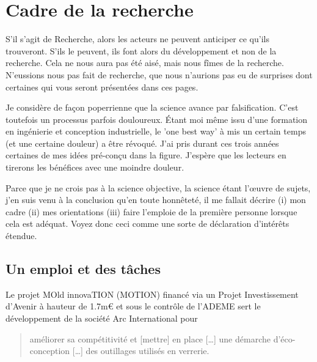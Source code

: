 \section{Cadre de la recherche}
S'il s'agit de Recherche, alors les acteurs ne peuvent anticiper ce qu'ils trouveront.
S'ils le peuvent, ils font alors du développement et non de la recherche.
Cela ne nous aura pas été aisé, mais nous fîmes de la recherche.
N'eussions nous pas fait de recherche, que nous n'aurions pas eu de surprises dont certaines qui vous seront présentées dans ces pages.

Je considère de façon poperrienne que la science avance par falsification.
C'est toutefois un processus parfois douloureux.
Étant moi même issu d'une formation en ingénierie et conception industrielle, le 'one best way' à mis un certain temps (et une certaine douleur) a être révoqué.
J'ai pris durant ces trois années certaines de mes idées pré-conçu dans la figure.
J'espère que les lecteurs en tirerons les bénéfices avec une moindre douleur.

Parce que je ne crois pas à la science objective, la science étant l'œuvre de sujets, j'en suis venu à la conclusion qu'en toute honnêteté, il me fallait décrire (i) mon cadre (ii) mes orientations (iii) faire l'emploie de la première personne lorsque cela est adéquat.
Voyez donc ceci comme une sorte de déclaration d'intérêts étendue.
\subsection{Un emploi et des tâches}

Le projet MOld innovaTION (MOTION) financé via un Projet Investissement d'Avenir à hauteur de 1.7m€ et sous le contrôle de l'\gls{ADEME} sert le développement de la société Arc International pour \blockcquote{ademe_motion._2013}{améliorer sa compétitivité et [mettre] en place [\ldots] une démarche d’éco-conception [\ldots] des outillages utilisés en verrerie.}

